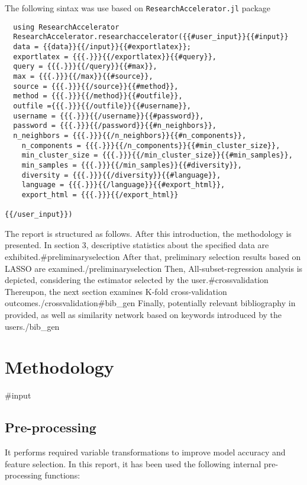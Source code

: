 \documentclass{article}
\begin{document}
The following sintax was use based on \verb|ResearchAccelerator.jl| package

\begin{lstlisting} 
  using ResearchAccelerator
  ResearchAccelerator.researchaccelerator({{#user_input}}{{#input}}
  data = {{data}}{{/input}}{{#exportlatex}};
  exportlatex = {{{.}}}{{/exportlatex}}{{#query}},
  query = {{{.}}}{{/query}}{{#max}},
  max = {{{.}}}{{/max}}{{#source}}, 
  source = {{{.}}}{{/source}}{{#method}}, 
  method = {{{.}}}{{/method}}{{#outfile}}, 
  outfile ={{{.}}}{{/outfile}}{{#username}},
  username = {{{.}}}{{/username}}{{#password}},
  password = {{{.}}}{{/password}}{{#n_neighbors}},
  n_neighbors = {{{.}}}{{/n_neighbors}}{{#n_components}}, 
	n_components = {{{.}}}{{/n_components}}{{#min_cluster_size}}, 
	min_cluster_size = {{{.}}}{{/min_cluster_size}}{{#min_samples}},
	min_samples = {{{.}}}{{/min_samples}}{{#diversity}},
	diversity = {{{.}}}{{/diversity}}{{#language}},
	language = {{{.}}}{{/language}}{{#export_html}},
	export_html = {{{.}}}{{/export_html}}
 
{{/user_input}})
\end{lstlisting}


The report is structured as follows. After this introduction, the methodology is presented. In section 3, descriptive statistics about the specified data are exhibited.{{#preliminaryselection}} After that, preliminary selection results based on LASSO are examined.{{/preliminaryselection}} Then, All-subset-regression analysis is depicted, considering the estimator selected by the user.{{#crossvalidation}} Thereupon, the next section examines K-fold cross-validation outcomes.{{/crossvalidation}}{{#bib_gen}} Finally, potentially relevant bibliography in provided, as well as similarity network based on keywords introduced by the users.{{/bib_gen}} 

\section{Methodology}

{{#input}}
\subsection{Pre-processing}
It performs required variable transformations to improve model accuracy and feature selection. In this report, it has been used the following internal pre-processing functions:
\end{document}

